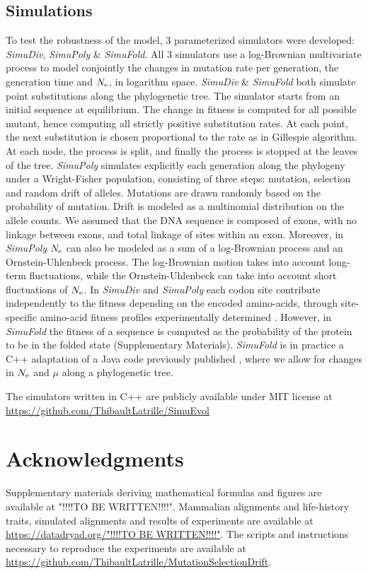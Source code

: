 \subsection{Simulations}
\label{sec:Simulation}
To test the robustness of the model, $3$ parameterized simulators were developed: \textit{SimuDiv}, \textit{SimuPoly} \& \textit{SimuFold}.
All $3$ simulators use a log-Brownian multivariate process to model conjointly the changes in mutation rate per generation, the generation time and $N_{\mathrm{e}}$, in logarithm space.
\textit{SimuDiv} \& \textit{SimuFold} both simulate point substitutions along the phylogenetic tree.
The simulator starts from an initial sequence at equilibrium.
The change in fitness is computed for all possible mutant, hence computing all strictly positive substitution rates.
At each point, the next substitution is chosen proportional to the rate as in Gillespie algorithm.
At each node, the process is split, and finally the process is stopped at the leaves of the tree.
\textit{SimuPoly} simulates explicitly each generation along the phylogeny under a Wright-Fisher population, consisting of three steps: mutation, selection and random drift of alleles.
Mutations are drawn randomly based on the probability of mutation.
Drift is modeled as a multinomial distribution on the allele counts.
We assumed that the DNA sequence is composed of exons, with no linkage between exons, and total linkage of sites within an exon.
Moreover, in \textit{SimuPoly} $N_{\mathrm{e}}$ can also be modeled as a sum of a log-Brownian process and an Ornstein-Uhlenbeck process.
The log-Brownian motion takes into account long-term fluctuations, while the Ornstein-Uhlenbeck can take into account short fluctuations of $N_{\mathrm{e}}$.
In \textit{SimuDiv} and \textit{SimuPoly} each codon site contribute independently to the fitness depending on the encoded amino-acids, through site-specific amino-acid fitness profiles experimentally determined \citep{Bloom2017}.
However, in \textit{SimuFold} the fitness of a sequence is computed as the probability of the protein to be in the folded state (Supplementary Materials).
\textit{SimuFold} is in practice a C++ adaptation of a Java code previously published \citep{Goldstein2016, Goldstein2017}, where we allow for changes in $N_{\mathrm{e}}$ and $\mu$ along a phylogenetic tree.

The simulators written in C++ are publicly available under MIT license at \url{https://github.com/ThibaultLatrille/SimuEvol}

\section{Acknowledgments}
Supplementary materials deriving mathematical formulas and figures are available at "!!!!TO BE WRITTEN!!!!".
Mammalian alignments and life-history traits, simulated alignments and results of experiments are available at \url{https://datadryad.org/"!!!!TO BE WRITTEN!!!!"}.
The scripts and instructions necessary to reproduce the experiments are available at \url{https://github.com/ThibaultLatrille/MutationSelectionDrift}.


